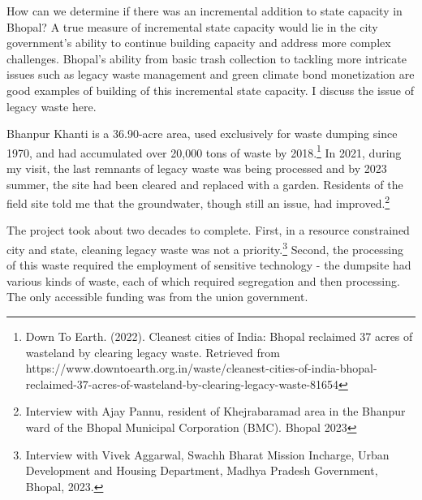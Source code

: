 How can we determine if there was an incremental addition to state capacity in Bhopal? A true measure of incremental state capacity would lie in the city government's ability to continue building capacity and address more complex challenges. Bhopal's ability from basic trash collection to tackling more intricate issues such as legacy waste management and green climate bond monetization are good examples of building of this incremental state capacity. I discuss the issue of legacy waste here.

Bhanpur Khanti is a 36.90-acre area, used exclusively for waste dumping since 1970, and had accumulated over 20,000 tons of waste by 2018.\footnote{Down To Earth. (2022). Cleanest cities of India: Bhopal reclaimed 37 acres of wasteland by clearing legacy waste. Retrieved from https://www.downtoearth.org.in/waste/cleanest-cities-of-india-bhopal-reclaimed-37-acres-of-wasteland-by-clearing-legacy-waste-81654} In 2021, during my visit, the last remnants of legacy waste was being processed and by 2023 summer, the site had been cleared and replaced with a garden. Residents of the field site told me that the groundwater, though still an issue, had improved.\footnote{Interview with Ajay Pannu, resident of Khejrabaramad area in the Bhanpur ward of the Bhopal Municipal Corporation (BMC). Bhopal 2023}

The project took about two decades to complete. First, in a resource constrained city and state, cleaning legacy waste was not a priority.\footnote{Interview with Vivek Aggarwal, Swachh Bharat Mission Incharge, Urban Development and Housing Department, Madhya Pradesh Government, Bhopal, 2023.} Second, the processing of this waste required the employment of sensitive technology - the dumpsite had various kinds of waste, each of which required segregation and then processing. The only accessible funding was from the union government.


